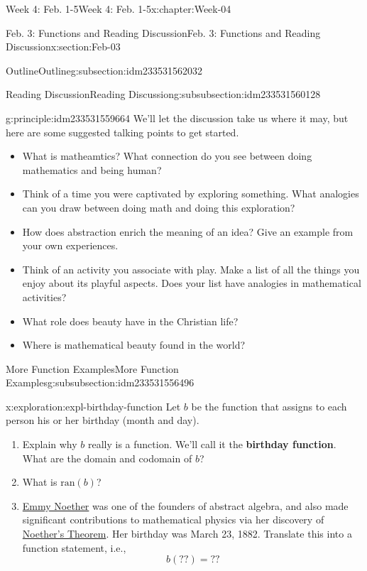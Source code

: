 \documentclass[oneside,10pt,]{book}
\newcommand{\terminology}[1]{\textbf{#1}}
\numberwithin{equation}{section}
\def\ran{\text{ran}}
\begin{document}
\begin{chapterptx}{Week 4: Feb. 1-5}{}{Week 4: Feb. 1-5}{}{}{x:chapter:Week-04}
\begin{sectionptx}{Feb. 3: Functions and Reading Discussion}{}{Feb. 3: Functions and Reading Discussion}{}{}{x:section:Feb-03}
\begin{subsectionptx}{Outline}{}{Outline}{}{}{g:subsection:idm233531562032}
\begin{subsubsectionptx}{Reading Discussion}{}{Reading Discussion}{}{}{g:subsubsection:idm233531560128}
\begin{principle}{}{}{g:principle:idm233531559664}
We'll let the discussion take us where it may, but here are some suggested talking points to get started.%
%
\begin{itemize}[label=\textbullet]
\item{}What is matheamtics? What connection do you see between doing mathematics and being human?%
\item{}Think of a time you were captivated by exploring something. What analogies can you draw between doing math and doing this exploration?%
\item{}How does abstraction enrich the meaning of an idea? Give an example from your own experiences.%
\item{}Think of an activity you associate with play. Make a list of all the things you enjoy about its playful aspects. Does your list have analogies in mathematical activities?%
\item{}What role does beauty have in the Christian life?%
\item{}Where is mathematical beauty found in the world?%
\end{itemize}
\end{principle}
\end{subsubsectionptx}
%
%
\typeout{************************************************}
\typeout{************************************************}
%
\begin{subsubsectionptx}{More Function Examples}{}{More Function Examples}{}{}{g:subsubsection:idm233531556496}
\begin{exploration}{}{x:exploration:expl-birthday-function}%
Let \(b\) be the function that assigns to each person his or her birthday (month and day).%
%
\begin{enumerate}
\item{}Explain why \(b\) really is a function. We'll call it the \terminology{birthday function}.  What are the domain and codomain of \(b\)?%
\item{}What is \(\ran(b)\)?%
\item{}\href{https://en.wikipedia.org/wiki/Emmy_Noether}{Emmy Noether} was one of the founders of abstract algebra, and also made significant contributions to mathematical physics via her discovery of \href{https://en.wikipedia.org/wiki/Noether\%27s_theorem}{Noether's Theorem}. Her birthday was March 23, 1882. Translate this into a function statement, i.e.,%
\begin{equation*}
b(??) = ??
\end{equation*}
%

\end{enumerate}
\end{exploration}
\end{subsubsectionptx}
\end{subsectionptx}
\end{sectionptx}
\end{chapterptx}
\end{document}
